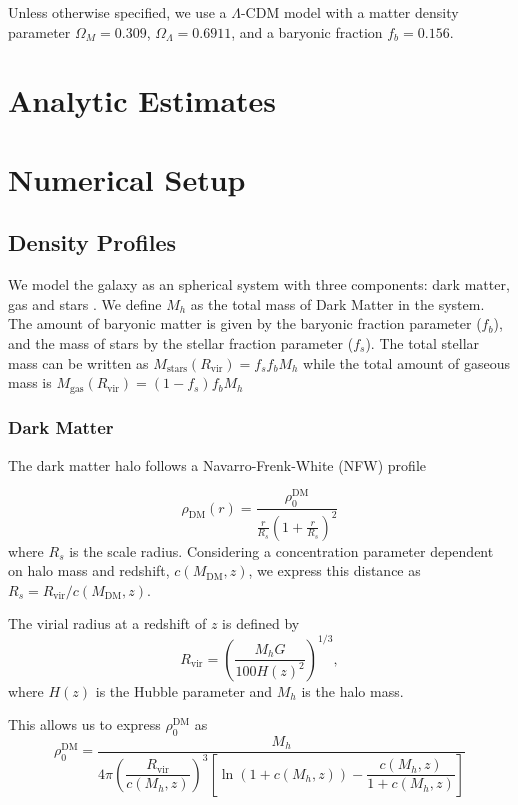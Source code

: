 \documentclass[fleqn,usenatbib]{mnras}
\begin{document}
Unless otherwise specified, we use a $\Lambda$-CDM model with a matter density parameter $\Omega_M = 0.309$, $\Omega_\Lambda = 0.6911$, and a baryonic fraction $f_b = 0.156$.

\section{Analytic Estimates}

\section{Numerical Setup}

\subsection{Density Profiles}

We model the galaxy as an spherical system with three components: dark matter, gas and stars \citep{tanaka2009assembly, choksi2017recoiling}. 
We define $M_{h}$ as the total mass of Dark Matter in the system.
The amount of baryonic matter is given by the baryonic fraction parameter ($f_b$), and the mass of stars by the stellar fraction parameter ($f_s$). 
The total stellar mass can be written as  $M_\text{stars}(R_\text{vir}) = f_sf_b M_h$ while the total amount of gaseous mass is $M_\text{gas}(R_\text{vir}) = (1 - f_s)f_bM_h$

\subsubsection{Dark Matter}
The dark matter halo follows a Navarro-Frenk-White (NFW) profile

\begin{equation}
\label{eq: dmdensity}
\rho_\text{DM}(r) = \dfrac{\rho_0^\text{DM}}{\frac{r}{R_s}\left(1 + \frac{r}{R_s}\right)^2}
\end{equation}
%
where $R_s$ is the scale radius.
Considering a concentration parameter dependent on halo mass and redshift, $c(M_\text{DM}, z)$, we express this distance as $ R_s = R_\text{vir}/c(M_\text{DM}, z)$.

The virial radius at a redshift of $z$ is defined by 
\begin{equation}
    R_\text{vir} = \left({\dfrac{M_hG}{100 H(z)^2}}\right)^{1/3}, 
\end{equation}
where $H(z)$ is the Hubble parameter and $M_h$ is the halo mass.

This allows us to express $\rho_0^{\text{DM}}$ as 
\begin{equation}\label{eq: rho0dm}
		\rho_0^\text{DM} = \dfrac{M_h}{4\pi \left(\dfrac{R_\text{vir}}{c(M_h, z)}\right)^3 \left[\ln\left(1 + c(M_h, z)\right) - \dfrac{c(M_h, z)}{1 + c(M_h, z)}\right]}
\end{equation}
		
\end{document}
